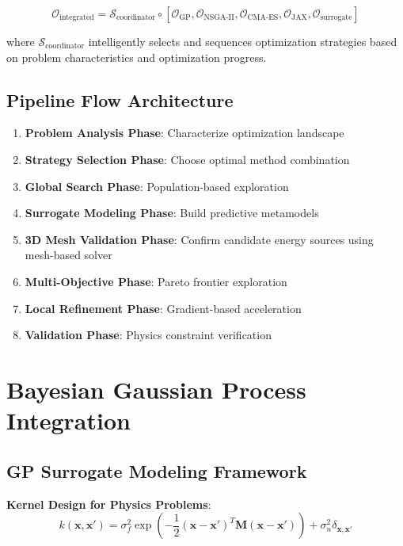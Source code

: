 \documentclass[11pt,a4paper]{article}
\begin{document}
\begin{equation}
\mathcal{O}_{\text{integrated}} = \mathcal{S}_{\text{coordinator}} \circ [\mathcal{O}_{\text{GP}}, \mathcal{O}_{\text{NSGA-II}}, \mathcal{O}_{\text{CMA-ES}}, \mathcal{O}_{\text{JAX}}, \mathcal{O}_{\text{surrogate}}]
\end{equation}

where $\mathcal{S}_{\text{coordinator}}$ intelligently selects and sequences optimization strategies based on problem characteristics and optimization progress.

\subsection{Pipeline Flow Architecture}

\begin{enumerate}
\item \textbf{Problem Analysis Phase}: Characterize optimization landscape
\item \textbf{Strategy Selection Phase}: Choose optimal method combination
\item \textbf{Global Search Phase}: Population-based exploration
\item \textbf{Surrogate Modeling Phase}: Build predictive metamodels
\item \textbf{3D Mesh Validation Phase}: Confirm candidate energy sources using mesh-based solver
\item \textbf{Multi-Objective Phase}: Pareto frontier exploration
\item \textbf{Local Refinement Phase}: Gradient-based acceleration
\item \textbf{Validation Phase}: Physics constraint verification
\end{enumerate}

\section{Bayesian Gaussian Process Integration}

\subsection{GP Surrogate Modeling Framework}

\textbf{Kernel Design for Physics Problems}:
\begin{equation}
k(\mathbf{x}, \mathbf{x}') = \sigma_f^2 \exp\left(-\frac{1}{2} (\mathbf{x} - \mathbf{x}')^T \mathbf{M} (\mathbf{x} - \mathbf{x}')\right) + \sigma_n^2 \delta_{\mathbf{x}, \mathbf{x}'}
\end{equation}
\end{document}
